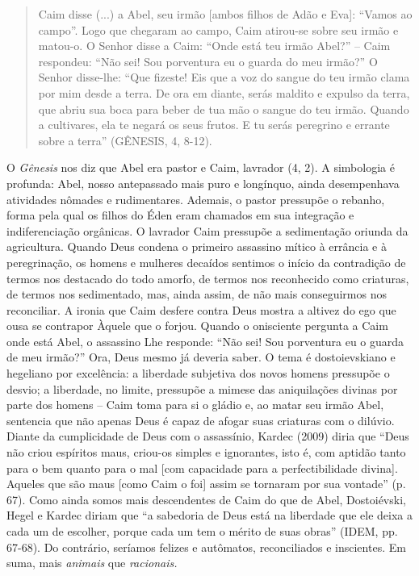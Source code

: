 \begin{quote}
Caim disse (...) a Abel, seu irmão {[}ambos filhos de Adão e Eva{]}:
``Vamos ao campo''. Logo que chegaram ao campo, Caim atirou-se sobre seu
irmão e matou-o. O Senhor disse a Caim: ``Onde está teu irmão Abel?'' --
Caim respondeu: ``Não sei! Sou porventura eu o guarda do meu irmão?'' O
Senhor disse-lhe: ``Que fizeste! Eis que a voz do sangue do teu irmão
clama por mim desde a terra. De ora em diante, serás maldito e expulso
da terra, que abriu sua boca para beber de tua mão o sangue do teu
irmão. Quando a cultivares, ela te negará os seus frutos. E tu serás
peregrino e errante sobre a terra'' (GÊNESIS, 4, 8-12).
\end{quote}

O \emph{Gênesis} nos diz que Abel era pastor e Caim, lavrador (4, 2). A
simbologia é profunda: Abel, nosso antepassado mais puro e longínquo,
ainda desempenhava atividades nômades e rudimentares. Ademais, o pastor
pressupõe o rebanho, forma pela qual os filhos do Éden eram chamados em
sua integração e indiferenciação orgânicas. O lavrador Caim pressupõe a
sedimentação oriunda da agricultura. Quando Deus condena o primeiro
assassino mítico à errância e à peregrinação, os homens e mulheres
decaídos sentimos o início da contradição de termos nos destacado do
todo amorfo, de termos nos reconhecido como criaturas, de termos nos
sedimentado, mas, ainda assim, de não mais conseguirmos nos reconciliar.
A ironia que Caim desfere contra Deus mostra a altivez do ego que ousa
se contrapor Àquele que o forjou. Quando o onisciente pergunta a Caim
onde está Abel, o assassino Lhe responde: ``Não sei! Sou porventura eu o
guarda de meu irmão?'' Ora, Deus mesmo já deveria saber. O tema é
dostoievskiano e hegeliano por excelência: a liberdade subjetiva dos
novos homens pressupõe o desvio; a liberdade, no limite, pressupõe a
mimese das aniquilações divinas por parte dos homens -- Caim toma para
si o gládio e, ao matar seu irmão Abel, sentencia que não apenas Deus é
capaz de afogar suas criaturas com o dilúvio. Diante da cumplicidade de
Deus com o assassínio, Kardec (2009) diria que ``Deus não criou
espíritos maus, criou-os simples e ignorantes, isto é, com aptidão tanto
para o bem quanto para o mal {[}com capacidade para a perfectibilidade
divina{]}. Aqueles que são maus {[}como Caim o foi{]} assim se tornaram
por sua vontade'' (p. 67). Como ainda somos mais descendentes de Caim do
que de Abel, Dostoiévski, Hegel e Kardec diriam que ``a sabedoria de
Deus está na liberdade que ele deixa a cada um de escolher, porque cada
um tem o mérito de suas obras'' (IDEM, pp. 67-68). Do contrário,
seríamos felizes e autômatos, reconciliados e inscientes. Em suma, mais
\emph{animais} que \emph{racionais. }

